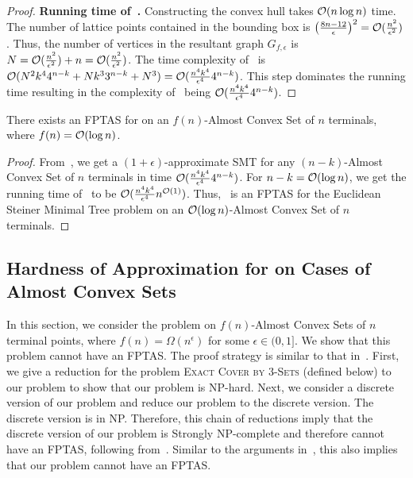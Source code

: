 \begin{proof}
{\bf Running time of~.}
    Constructing the convex hull takes $\mathcal{O}(n\log n)$ time. The number of lattice points contained in the bounding box is $\big(\frac{8n-12}{\epsilon}\big)^2 = \mathcal{O}(\frac{n^2}{\epsilon ^2})$. Thus, the number of vertices in the resultant graph $G_{f,\epsilon}$ is $N = \mathcal{O}(\frac{n^2}{\epsilon ^2}) + n = \mathcal{O}(\frac{n^2}{\epsilon ^2})$. The time complexity of~ is $\mathcal{O}(N^2k^44^{n-k}+Nk^33^{n-k}+N^3) = \mathcal{O}(\frac{n^4k^4}{\epsilon ^4}4^{n-k})$. This step dominates the running time resulting in the complexity of~ being $\mathcal{O}(\frac{n^4k^4}{\epsilon ^4}4^{n-k})$.
    \end{proof}

\begin{theorem}\label{thm:esmt_fptas}
    There exists an FPTAS for \ESMT on an $f(n)$-Almost Convex Set of $n$ terminals, where $f(n) = \mathcal{O} (\log n)$.
\end{theorem}

\begin{proof}
    From~, we get a $(1+\epsilon)$-approximate SMT for any $(n-k)$-Almost Convex Set of $n$ terminals in time $\mathcal{O}(\frac{n^4k^4}{\epsilon ^4}4^{n-k})$. For $n-k = \mathcal{O}(\log n)$, we get the running time of~ to be $\mathcal{O}(\frac{n^4k^4}{\epsilon ^4}n^{\mathcal{O}(1)})$. Thus,~ is an FPTAS for the Euclidean Steiner Minimal Tree problem on an $\mathcal{O} (\log n)$-Almost Convex Set of $n$ terminals. 
\end{proof}

\subsection{Hardness of Approximation for \ESMT on Cases of Almost Convex Sets}\label{subsec:apx_hardness}

In this section, we consider the \ESMT problem on $f(n)$-Almost Convex Sets of $n$ terminal points, where $f(n) =\Omega(n^\epsilon)$ for some $\epsilon \in (0,1]$. We show that this problem cannot have an FPTAS. The proof strategy is similar to that in~\cite{garey1977complexity}. First, we give a reduction for the problem \textsc{Exact Cover by $3$-Sets} (defined below) to our problem to show that our problem is NP-hard. Next, we consider a discrete version of our problem and reduce our problem to the discrete version. The discrete version is in NP. Therefore, this chain of reductions imply that the discrete version of our problem is Strongly NP-complete and therefore cannot have an FPTAS, following from~\cite{garey1977complexity}. Similar to the arguments in~\cite{garey1977complexity}, this also implies that our problem cannot have an FPTAS.

